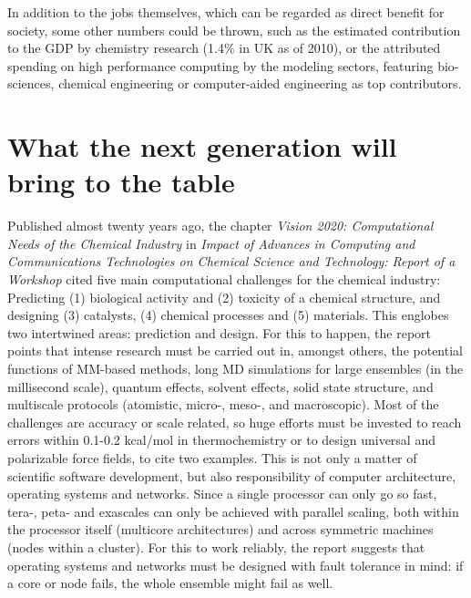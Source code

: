 In addition to the jobs themselves, which can be regarded as direct benefit for society, some other numbers could be thrown, such as the estimated contribution to the GDP by chemistry research (1.4$\%$  in UK as of 2010\cite{UKeconomics}), or the attributed spending on high performance computing by the modeling sectors, featuring bio-sciences, chemical engineering or computer-aided engineering as top contributors.\cite{hpc2020}



\section{What the next generation will bring to the table}

Published almost twenty years ago, the chapter \textit{Vision 2020: Computational Needs of the Chemical Industry} in \textit{Impact of Advances in Computing and Communications Technologies on Chemical Science and Technology: Report of a Workshop}\cite{vision2020} cited five main computational challenges for the chemical industry: Predicting (1) biological activity and (2) toxicity of a chemical structure, and designing (3) catalysts, (4) chemical processes and (5) materials. This englobes two intertwined areas: prediction and design. For this to happen, the report points that intense research must be carried out in, amongst others, the potential functions of MM-based methods, long MD simulations for large ensembles (in the millisecond scale), quantum effects, solvent effects, solid state structure, and multiscale protocols (atomistic, micro-, meso-, and macroscopic). Most of the challenges are accuracy or scale related, so huge efforts must be invested to reach errors within 0.1-0.2 kcal/mol in thermochemistry or to design universal and polarizable force fields, to cite two examples. This is not only a matter of scientific software development, but also responsibility of computer architecture, operating systems and networks. Since a single processor can only go so fast, tera-, peta- and exascales can only be achieved with parallel scaling, both within the processor itself (multicore architectures) and across symmetric machines (nodes within a cluster). For this to work reliably, the report suggests that operating systems and networks must be designed with fault tolerance in mind: if a core or node fails, the whole ensemble might fail as well.

